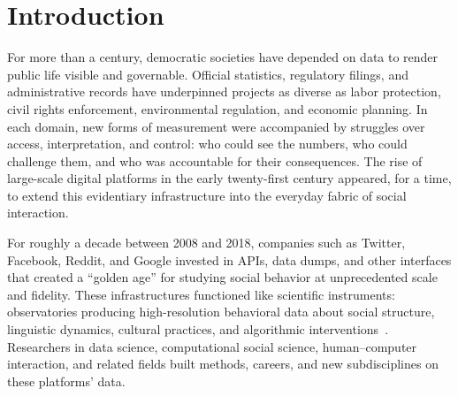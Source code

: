 \documentclass[acmsmall,screen]{acmart}
\begin{document}

\maketitle

\section*{Introduction}

For more than a century, democratic societies have depended on data to render public life visible and governable. Official statistics, regulatory filings, and administrative records have underpinned projects as diverse as labor protection, civil rights enforcement, environmental regulation, and economic planning. In each domain, new forms of measurement were accompanied by struggles over access, interpretation, and control: who could see the numbers, who could challenge them, and who was accountable for their consequences. The rise of large-scale digital platforms in the early twenty-first century appeared, for a time, to extend this evidentiary infrastructure into the everyday fabric of social interaction. 

For roughly a decade between 2008 and 2018, companies such as Twitter, Facebook, Reddit, and Google invested in APIs, data dumps, and other interfaces that created a ``golden age'' for studying social behavior at unprecedented scale and fidelity. These infrastructures functioned like scientific instruments: observatories producing high-resolution behavioral data about social structure, linguistic dynamics, cultural practices, and algorithmic interventions~\cite{Bruns_APIcalypsesocialmedia_2019,lazer_ComputationalSocialScience_2020,proferes_StudyingRedditSystematic_2021,Hampton_StudyingDigitalDirections_2017,GolderDigitalFootprintsOpportunities2014,Lazer_DataexMachina_2017}. Researchers in data science, computational social science, human–computer interaction, and related fields built methods, careers, and new subdisciplines on these platforms' data.
\end{document}
